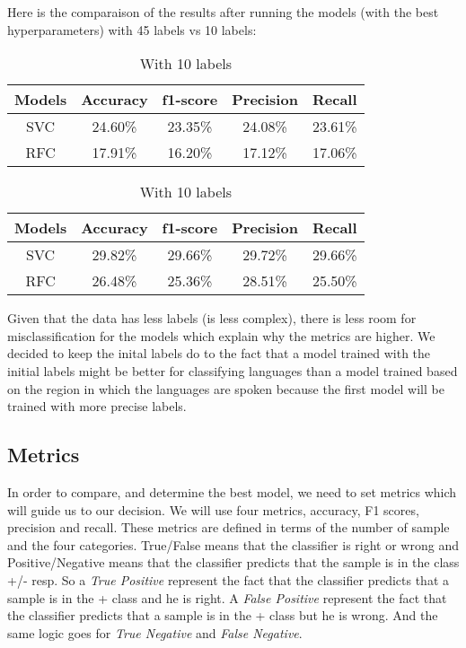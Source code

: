 \documentclass[twocolumn]{article}
\begin{document}
Here is the comparaison of the results after running the models (with the best hyperparameters) with 45 labels vs 10 labels:
\begin{table}[h]
    \centering
    \begin{tabular}{|c|c|c|c|c|}
    \hline
      Models & Accuracy & f1-score & Precision & Recall\\  
      \hline
      SVC & 24.60\% & 23.35\% & 24.08\% & 23.61\% \\
        \hline
      RFC & 17.91\% & 16.20\% & 17.12\% & 17.06\% \\
    \hline
    \end{tabular}
    \label{tab:my_label}
    \caption{With 45 labels}
    
    \centering
    \begin{tabular}{|c|c|c|c|c|}
    \hline
      Models & Accuracy & f1-score & Precision & Recall\\  
      \hline
      SVC & 29.82\% & 29.66\% & 29.72\% & 29.66\%\\
        \hline
      RFC & 26.48\% & 25.36\% & 28.51\% & 25.50\% \\
    \hline
    \end{tabular}
    \label{tab:my_label}
    \caption{With 10 labels}
\end{table}

Given that the data has less labels (is less complex), there is less room for misclassification for the models which explain why the metrics are higher. We decided to keep the inital labels do to the fact that a model trained with the initial labels might be better for classifying languages than a model trained based on the region in which the languages are spoken because the first model will be trained with more precise labels.

\subsection{Metrics}
\label{5.2}
In order to compare, and determine the best model, we need to set metrics which will guide us to our decision. We will use four metrics, accuracy, F1 scores, precision and recall. These metrics are defined in terms of the number of sample and the four categories. True/False means that the classifier is right or wrong and Positive/Negative means that the classifier predicts that the sample is in the class +/- resp. So a \textit{True Positive} represent the fact that the classifier predicts that a sample is in the + class and he is right. A \textit{False Positive} represent the fact that the classifier predicts that a sample is in the + class but he is wrong. And the same logic goes for \textit{True Negative}  and \textit{False Negative}.
\end{document}
